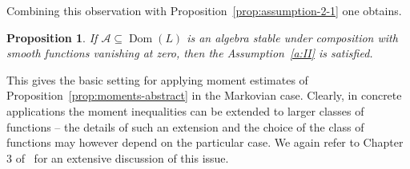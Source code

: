 \documentclass[a4paper]{amsart}
\newtheorem{proposition}[theorem]{Proposition} %
\theoremstyle{definition}
\theoremstyle{remark}
\numberwithin{equation}{section}
\newcommand*{\calA}{\mathcal{A}}
\DeclareMathOperator{\Dom}{Dom} %
\begin{document}
Combining this observation with Proposition~\ref{prop:assumption-2-1} one obtains.

\begin{proposition}\label{prop:assumption-2}
If $\calA \subseteq \Dom(L)$ is an algebra stable under composition with smooth functions vanishing at zero, then the Assumption~\ref{a:II} is satisfied.
\end{proposition}

This gives the basic setting for applying moment estimates of Proposition~\ref{prop:moments-abstract} in the Markovian case. Clearly, in concrete applications the moment inequalities can be extended to larger classes of functions -- the details of such an extension and the choice of the class of functions may however depend on the particular case. We again refer to Chapter 3 of~\cite{MR3155209} for an extensive discussion of this issue.




\end{document}
